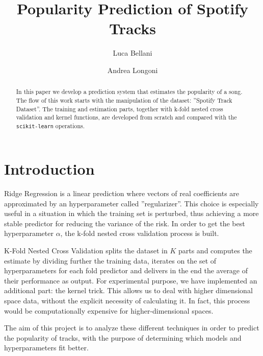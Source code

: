 \documentclass{article}
\begin{document}
\title{\textbf{Popularity Prediction of Spotify Tracks}}
\author{Luca Bellani}
\author{Andrea Longoni}
\date{}

\maketitle


\begin{abstract}
	In this paper we develop a prediction system that estimates the popularity of a song. The flow of this work starts with the manipulation of the dataset: ''Spotify Track Dataset''. The training and estimation parts, together with k-fold nested cross validation and kernel functions, are developed from scratch and compared with the \texttt{scikit-learn} operations. 
\end{abstract}
    
    
\section{Introduction}
Ridge Regression is a linear prediction where vectors of real coefficients are approximated by an hyperparameter called ''regularizer''. This choice is especially useful in a situation in which the training set is perturbed, thus achieving a more stable predictor for reducing the variance of the risk. \newline
In order to get the best hyperparameter $\alpha$, the k-fold nested cross validation process is built.

K-Fold Nested Cross Validation splits the dataset in $K$ parts and computes the estimate by dividing further the training data, iterates on the set of hyperparameters for each fold predictor and delivers in the end the average of their performance as output.  
For experimental purpose, we have implemented an additional part: the kernel trick. This allows us to deal with higher dimensional space data, without the explicit necessity of calculating it. In fact, this process would be computationally expensive for higher-dimensional spaces.\newline
    
The aim of this project is to analyze these different techniques in order to predict the popularity of tracks, with the purpose of determining which models and hyperparameters fit better. 

    
\end{document}
